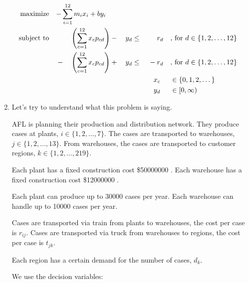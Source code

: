 \documentclass[12pt,letterpaper]{article}
\newcommand*\buck[1]{%
  \$\num{#1}%
}
\begin{document}
\begin{enumerate}
      \begin{alignat*}{9}
        \text{maximize}   \quad \mathrlap{-\sum_{i = 1}^{12}m_i x_i + b y_i}  \\
        \text{subject to} \quad &       &\left(\sum_{c = 1}^{12} x_c p_{cd}\right) & {}-{} & y_d & {}\leq{} &       & r_d            && \text{, for } d \in \{1, 2, \dots, 12\} \\
                                & {}-{} &\left(\sum_{c = 1}^{12} x_c p_{cd}\right) & {}+{} & y_d & {}\leq{} & {}-{} & r_d            && \text{, for } d \in \{1, 2, \dots, 12\} \\
                                &       &                                          &       &     &          &       & \mathclap{x_c} && \in  \{0, 1, 2, \dots\} \\
                                &       &                                          &       &     &          &       & \mathclap{y_d} && \in  [0, \infty) \\
      \end{alignat*}

    \pagebreak

    \item [r11-35)]

      Let's try to understand what this problem is saying.

      AFL is planning their production and distribution network.
      They produce cases at plants, $i \in \{1, 2, \dots, 7\}$.
      The cases are transported to warehouses, $j \in \{1, 2, \dots, 13\}$.
      From warehouses, the cases are transported to customer regions, $k \in \{1, 2, \dots, 219\}$.

      Each plant has a fixed construction cost \buck{50000000}.
      Each warehouse has a fixed construction cost \buck{12000000}.

      Each plant can produce up to \num{30000} cases per year.
      Each warehouse can handle up to \num{10000} cases per year.

      Cases are transported via train from plants to warehouses, the cost per case is $r_{ij}$.
      Cases are transported via truck from warehouses to regions, the cost per case is $t_{jk}$.

      Each region has a certain demand for the number of cases, $d_k$.

      We use the decision variables:


\end{enumerate}
\end{document}
